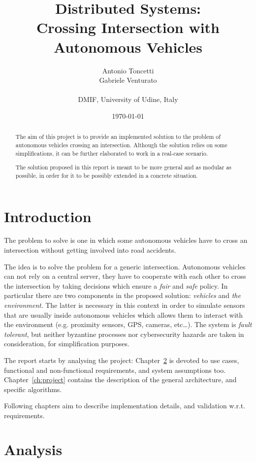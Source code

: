 \documentclass{memoir}
\title{Distributed Systems:\\Crossing Intersection with Autonomous Vehicles}
\author{Antonio Toncetti\\Gabriele Venturato\\\\DMIF, University of Udine, Italy}
\date{%
	\today}
\begin{document}
\maketitle
\begin{abstract}
The aim of this project is to provide an implemented solution to the problem of autonomous vehicles crossing an intersection.
Although the solution relies on some simplifications, it can be further elaborated to work in a real-case scenario.

The solution proposed in this report is meant to be more general and as modular as possible, in order for it to be possibly extended in a concrete situation.
\end{abstract}

\chapter{Introduction}\label{ch:intro}

The problem to solve is one in which some autonomous vehicles have to cross an intersection without getting involved into road accidents. 

The idea is to solve the problem for a generic intersection. Autonomous vehicles can not rely on a central server, they have to cooperate with each other to cross the intersection by taking decisions which ensure a \emph{fair} and \emph{safe} policy. In particular there are two components in the proposed solution: \emph{vehicles} and \emph{the environment}. The latter is necessary in this context in order to simulate sensors that are usually inside autonomous vehicles which allows them to interact with the environment (e.g. proximity sensors, GPS, cameras, etc\dots).
The system is \emph{fault tolerant}, but neither byzantine processes nor cybersecurity hazards are taken in consideration, for simplification purposes.

The report starts by analysing the project: Chapter~\ref{ch:analysis} is devoted to use cases, functional and non-functional requirements, and system assumptions too. Chapter~\ref{ch:project} contains the description of the general architecture, and specific algorithms.

Following chapters aim to describe implementation details, and validation w.r.t. requirements.



\chapter{Analysis}\label{ch:analysis}
\end{document}
